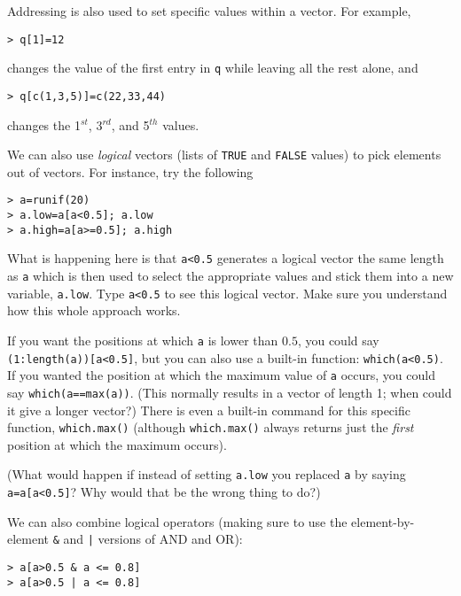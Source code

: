 \documentclass [11pt]{article}
\newcommand{\code}[1]{{\tt #1}}
\numberwithin{exercise}{section}
\begin{document}
Addressing is also used to set specific values within a vector. For 
example, 
\vspace{-0.1in}
\begin{verbatim}
> q[1]=12
\end{verbatim}
\vspace{-0.1in}
changes the value of the first entry in \texttt{q} while leaving 
all the rest alone, and 
\vspace{-0.1in}
\begin{verbatim}
> q[c(1,3,5)]=c(22,33,44)
\end{verbatim}
\vspace{-0.1in}
changes the 1$^{st}$, 3$^{rd}$, and 5$^{th}$ values. 


We can also use \emph{logical} vectors (lists of \code{TRUE} and \code{FALSE} values) to pick elements out of vectors.
For instance, try the following
\vspace{-0.1in}
\begin{verbatim}
> a=runif(20)
> a.low=a[a<0.5]; a.low
> a.high=a[a>=0.5]; a.high
\end{verbatim}
\vspace{-0.1in}
What is happening here is that \verb+a<0.5+ generates a logical vector the same
length as \code{a} which is then used to select the appropriate values and stick them into a new variable, \code{a.low}. 
Type \verb+a<0.5+ to see this logical vector. Make sure you understand how this whole approach works. 

If you want the positions at which \code{a}
is lower than $0.5$, you could say
\verb+(1:length(a))[a<0.5]+, but you
can also use a built-in function:
\verb+which(a<0.5)+.  If you wanted
the position at which the maximum value
of \code{a} occurs, you could say
\verb+which(a==max(a))+.  (This
normally results in a vector of length 1; when
could it give a longer vector?)  There
is even a built-in command for this
specific function, \code{which.max()} (although
\code{which.max()} always returns just the
\emph{first} position at which the maximum
occurs).

(What would happen if instead of setting
\code{a.low} you replaced \code{a}
by saying \verb+a=a[a<0.5]+?
Why would that be the wrong thing to do?)

We can also combine logical operators (making sure to
use the element-by-element \verb+&+ and \verb+|+ versions
of AND and OR):
\vspace{-0.1in}
\begin{verbatim}
> a[a>0.5 & a <= 0.8]
> a[a>0.5 | a <= 0.8]
\end{verbatim}
\vspace{-0.1in}
\end{document}

